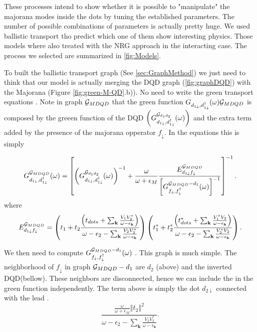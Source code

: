 These processes intend to show whether it is possible to "manipulate" the majorana modes inside the dots by tuning the established parameters. The number of possible combinations of parameters is actually pretty huge. We used ballistic transport tho predict which one of them show interesting physics. Those models where also treated with the NRG approach in the interacting case. The process we selected are summarized in \ref{fig:Models}. 

To built the ballistic transport graph (See \ref{sec:GraphMethod}) we just need to think that our model is actually merging the DQD graph (\ref{fig:graphDQD}) with the Majorana (Figure \ref{fig:green-M-QD}.b)). No need to write the green transport equations . Note  in graph $\mathcal{G}_{MDQD}$ that the  green function  $G_{d_{1\downarrow},d_{1\downarrow}^{\dagger}}(\omega){\mathcal{G}_{MDQD}}$  is composed by the greeen function of the DQD $\left(G_{d_{1\downarrow},d_{1\downarrow}^{\dagger}}^{ \mathcal{G}_{d_1d_2} } (\omega) \right)$ and the extra term added by the presence of the majorana opperator $f_\downarrow$. In the equations this is simply 

\begin{equation}
    G_{d_{1\downarrow},d_{1\downarrow}^{\dagger}}^{ \mathcal{G}_{MDQD}} (\omega)=\left[\left(G_{d_{1\downarrow},d_{1\downarrow}^{\dagger}}^{ \mathcal{G}_{d_1d_2} } (\omega) \right)^{-1}+\frac{\omega}{\omega+\epsilon_{M}}\frac{E_{d_{1\downarrow}f_{\downarrow}}^{\mathcal{G}_{MDQD}}}{\left[G_{f_{\downarrow},f_{\downarrow}^{\dagger}}^{ \mathcal{G}_{MDQD}-d_{1}} (\omega)\right]^{-1}}\right]^{-1}.
\end{equation}
where 
\begin{equation}
    E_{d_{1\downarrow}f_{\downarrow}}^{\mathcal{G}_{MDQD}}=\left(t_{1}+t_{2}\frac{\left(t_{dots}+\sum_{\mathbf{k}}\frac{V_{1}V_{2}^{*}}{\omega-\epsilon_{\mathbf{k}}}\right)}{\omega-\epsilon_{2}-\sum_{\mathbf{k}}\frac{V_{2}V_{2}^{*}}{\omega-\epsilon_{\mathbf{k}}}}\right)\left(t_{1}^{*}+t_{2}^{*}\frac{\left(t_{dots}^{*}+\sum_{\mathbf{k}}\frac{V_{1}^{*}V_{2}}{\omega-\epsilon_{\mathbf{k}}}\right)}{\omega-\epsilon_{2}-\sum_{\mathbf{k}}\frac{V_{2}^{*}V_{2}}{\omega-\epsilon_{\mathbf{k}}}}\right).
\end{equation}

We then need to compute $G_{f_{\downarrow},f_{\downarrow}^{\dagger}}^{ \mathcal{G}_{MDQD}-d_{1}} (\omega)$ . This graph is much simple. The neighborhood of  $f_{\downarrow}$ in graph ${\mathcal{G}_{MDQD}-d_{1}}$ are $d_2$ (above) and the inverted DQD(bellow). These neighbors are disconnected, hence we can include the in the green function independently. The term above is simply the dot $d_{2\downarrow}$ connected with the lead . 
\begin{equation}
    \frac{\frac{\omega}{\omega+\epsilon_{M}}\left\Vert t_{2}\right\Vert ^{2}}{\omega-\epsilon_{2}-\sum_{\mathbf{k}}\frac{V_{2}V_{2}^{*}}{\omega-\epsilon_{\mathbf{k}}}}.
\end{equation}

